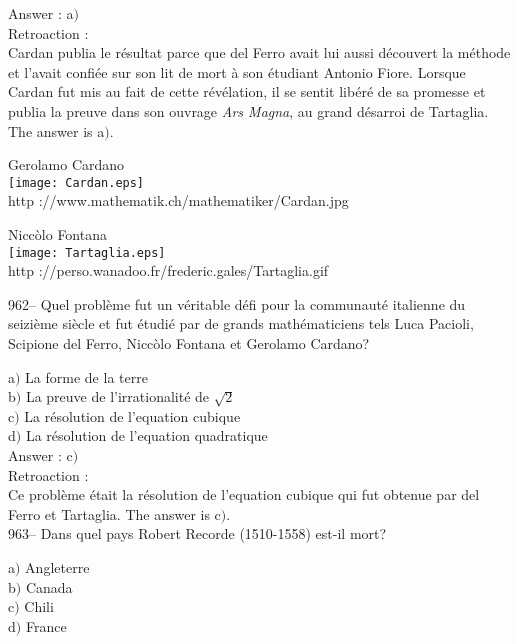 ﻿\documentclass[letterpaper, 12pt]{article}
\begin{document}
Answer : a$)$\\

Retroaction : \\
Cardan publia le r\'esultat parce que del Ferro avait lui aussi
d\'ecouvert la m\'ethode et l'avait confi\'ee sur son lit de mort
\`a son \'etudiant Antonio Fiore. Lorsque Cardan fut mis au fait de
cette r\'ev\'elation, il se sentit lib\'er\'e de sa promesse et
publia la preuve dans son ouvrage
{\sl Ars Magna}, au grand d\'esarroi de Tartaglia. The answer is a$)$.\\

        \begin{center}
        Gerolamo Cardano\\
    \texttt{[image: Cardan.eps]}\\
        {\footnotesize http ://www.mathematik.ch/mathematiker/Cardan.jpg}
    \end{center}

        \begin{center}
        Nicc\`olo Fontana\\
    \texttt{[image: Tartaglia.eps]}\\
        {\footnotesize http
://perso.wanadoo.fr/frederic.gales/Tartaglia.gif}
    \end{center}

962-- Quel probl\`eme fut un v\'eritable d\'efi pour la communaut\'e
italienne du seizi\`eme si\`ecle et fut \'etudi\'e par de grands
math\'ematiciens tels Luca Pacioli, Scipione del Ferro, Nicc\`olo
Fontana et Gerolamo Cardano?

a$)$ La forme de la terre \\
b$)$ La preuve de l'irrationalit\'e de $\sqrt2$ \\
c$)$ La r\'esolution de l'equation cubique  \\
d$)$ La r\'esolution de l'equation quadratique \\

Answer : c$)$\\

Retroaction : \\
Ce probl\`eme \'etait la r\'esolution de l'equation cubique qui
fut obtenue
par del Ferro et Tartaglia. The answer is c$)$.\\

963-- Dans quel pays Robert Recorde (1510-1558) est-il mort?

a$)$ Angleterre \\
b$)$ Canada  \\
c$)$ Chili \\
d$)$ France\\
\end{document}
